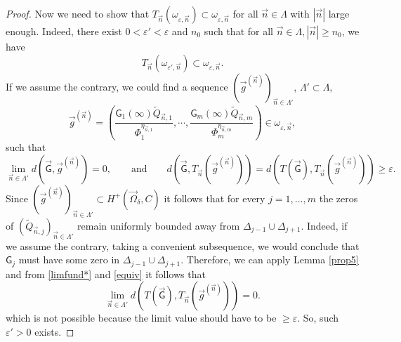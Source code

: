 \documentclass{amsart}
\numberwithin{equation}{section}
\theoremstyle{definition}
\newcommand{\n}{\vec{n}}          %
\begin{document}
\begin{proof}
Now we need to show that $T_{\n}(\omega_{\varepsilon, \n})\subset \omega_{\varepsilon, \n}$ for all $\n \in \Lambda$ with $|\n|$ large enough. Indeed, there exist $0 < \varepsilon' < \varepsilon$ and $n_0$ such that for all $\n \in \Lambda, |\n| \geq n_0$, we have
 \begin{equation}
 	\label{include1}
 	T_{\n}(\omega_{\varepsilon', \n})\subset \omega_{\varepsilon, \n}.
 \end{equation}
 If we assume the contrary, we could find a sequence $(\vec{g}^{(\n)})_{\n \in \Lambda'}$, $\Lambda' \subset \Lambda$,
 \[ \vec{g}^{(\n)} =  \left(\frac{\mathsf{G}_1(\infty) \tilde{Q}_{\n,1}}{\Phi_1^{\eta_{\n,1}}}, \cdots, \frac{\mathsf{G}_m(\infty) \tilde{Q}_{\n,m}}{\Phi_m^{\eta_{\n,m}}}\right)
  \in \omega_{\varepsilon, \n},
 \] such that
 \[
 \lim_{\n \in \Lambda'} d(\vec{\mathsf{G}}, \vec{g}^{(\n)}) = 0, \qquad \mbox{and} \qquad d(\vec{\mathsf{G}},T_{\n}(\vec{g}^{(\n)})) = d(T(\vec{\mathsf{G}}),T_{\n}(\vec{g}^{(\n)}))\geq \varepsilon.
 \]
 Since $ (\vec{g}^{(\n)})_{\n \in \Lambda'} \subset H^+(\vec{\Omega}_{\delta}, C)$ it follows that for every $j=1,\ldots,m$ the zeros of $(\tilde{Q}_{\n,j})_{\n \in \Lambda'}$ remain uniformly bounded away from $\Delta_{j-1} \cup \Delta_{j+1}$. Indeed, if we assume the contrary, taking a convenient subsequence, we would conclude that $\mathsf{G}_j$ must have some zero in $\Delta_{j-1} \cup \Delta_{j+1}$. Therefore, we can apply Lemma \ref{prop5} and from
 \eqref{limfund*}   and \eqref{equiv} it follows that
 \[
 \lim_{\n \in \Lambda'} d(T(\vec{\mathsf{G}}),  {T}_{\n}( \vec{g}^{(\n)})) = 0.
 \]
 which is not possible because the limit value should have to be $\geq \varepsilon$. So, such $\varepsilon' > 0$ exists.


\end{proof}
\end{document}
